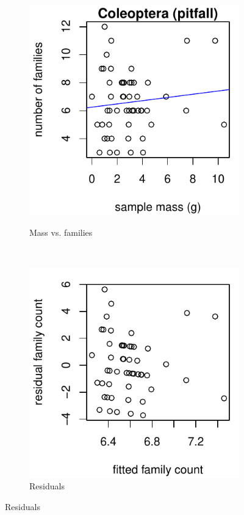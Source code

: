 \documentclass[10pt,letterpaper,twocolumn]{article}
\begin{document}
\begin{figure}[h]
	\centering
	\begin{subfigure}[b]{0.15\textwidth}
		\caption{Mass vs. families}
		\includegraphics[width=\textwidth]{plots/mass-vs-count/scatter/2015_pitfall_Coleoptera_mass-vs-count.pdf}
		\label{fig:pitfall_coleoptera_scatter}
	\end{subfigure}
	~
	\begin{subfigure}[b]{0.15\textwidth}
		\caption{Residuals}
		\includegraphics[width=\textwidth]{plots/mass-vs-count/residual/2015_pitfall_Coleoptera_residual.pdf}

\end{subfigure}
\end{figure}
\end{document}
